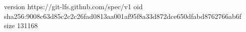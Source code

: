 version https://git-lfs.github.com/spec/v1
oid sha256:9008c63d85c2c2c26fad0813aa001af95f8a33d872dce650dfabd8762766ab6f
size 131168
